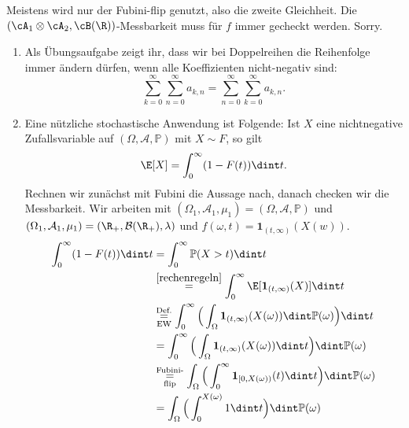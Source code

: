 	\begin{warnung}
		Meistens wird nur der Fubini-flip genutzt, also die zweite Gleichheit. Die $(\cA_1 \otimes \cA_2, \cB(\R))$-Messbarkeit muss f\"ur $f$ immer gecheckt werden. Sorry.
	\end{warnung}

\begin{beispiel}\abs
	\begin{enumerate}[label=(\roman*)]
		\item
			Als \"Ubungsaufgabe zeigt ihr, dass wir bei Doppelreihen die Reihenfolge immer \"andern d\"urfen, wenn alle Koeffizienten nicht-negativ sind:
		 \[ \sum\limits_{k = 0}^{\infty} \sum\limits_{n = 0}^{\infty} a_{k,n} = \sum\limits_{n = 0}^{\infty} \sum\limits_{k = 0}^{\infty} a_{k,n}. \] 
		\item Eine n\"utzliche stochastische Anwendung ist Folgende: Ist $X$ eine nichtnegative Zufallsvariable auf $(\Omega, \mathcal A, \mathbb P)$ mit $X\sim F$, so gilt
		\[ \E[X] = \int_{0}^{\infty} (1- F(t)) \dint t. \]
		Rechnen wir zun\"achst mit Fubini die Aussage nach, danach checken wir die Messbarkeit. Wir arbeiten mit $(\Omega_1, \mathcal A_1, \mu_1)=(\Omega,\mathcal A, \mathbb P)$ und $(\Omega_1, \mathcal A_1, \mu_1)=(\R_+, \mathcal B(\R_+), \lambda)$ und $f(\omega, t)=\mathbf 1_{(t,\infty)}(X(w))$.
		\begin{align*}
			\int_{0}^{\infty} (1- F(t)) \dint t &= \int_{0}^{\infty} \mathbb{P}(X > t) \dint t\\
			& \overset{\ref{rechenregeln}}{=} \int_{0}^{\infty} \E[\mathbf{1}_{(t,\infty)}(X)] \dint t \\
			&\overset{\text{Def.}}{\underset{\text{EW}}{=}} \int_{0}^{\infty} \Big( \int_{\Omega} \mathbf{1}_{(t,\infty)}(X(\omega)) \dint \mathbb{P}(\omega) \Big) \dint t\\
			&=\int_{0}^{\infty} \Big( \int_{\Omega} \mathbf{1}_{(t,\infty)}(X(\omega)) \dint t\Big) \dint \mathbb{P}(\omega) \\
			& \underset{\text{flip}}{\overset{\text{Fubini-}}{=}} \int_{\Omega} \Big( \int_{0}^{\infty} \mathbf{1}_{[0,X(\omega))}(t) \dint t \Big) \dint \mathbb{P}(\omega)\\
			&=\int_{\Omega} \Big( \int_{0}^{X(\omega)} 1 \dint t \Big) \dint \mathbb{P}(\omega)\\

\end{align*}
\end{enumerate}
\end{beispiel}
